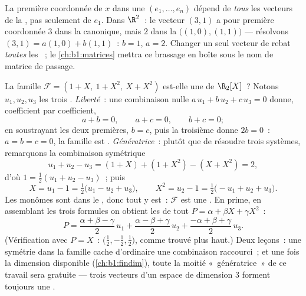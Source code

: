 \begin{remark}
\label{rem:b1:vspaces:teameffort}
La première coordonnée de $x$ dans une  $(e_1, \dots, e_n)$
dépend de \emph{tous} les vecteurs de la , pas seulement de $e_1$.
Dans $\R^2$~: le vecteur $(3, 1)$ a pour première coordonnée $3$ dans
la  canonique, mais $2$ dans la 
$\bigl((1,0), (1,1)\bigr)$ --- résolvons $(3,1) = a(1,0) + b(1,1)$~:
$b = 1$, $a = 2$. Changer un seul vecteur de  rebat \emph{toutes}
les ~; le \cref{ch:b1:matrices} mettra ce brassage en
boîte sous le nom de matrice de passage.
\end{remark}

\begin{example}
\label{ex:b1:vspaces:testbasis}
La famille $\mathcal{F} = (1 + X,\ 1 + X^2,\ X + X^2)$ est-elle une
 de $\R_2[X]$~? Notons $u_1, u_2, u_3$ les trois .
\emph{Liberté}~: une combinaison nulle $a\,u_1 + b\,u_2 + c\,u_3 =
0$ donne, coefficient par coefficient,
\[
a + b = 0, \qquad a + c = 0, \qquad b + c = 0 ;
\]
en soustrayant les deux premières, $b = c$, puis la troisième donne
$2b = 0$~: $a = b = c = 0$, la famille est . \emph{Génératrice}~:
plutôt que de résoudre trois systèmes, remarquons la combinaison
symétrique
\[
u_1 + u_2 - u_3 = (1 + X) + (1 + X^2) - (X + X^2) = 2 ,
\]
d'où $1 = \frac12(u_1 + u_2 - u_3)$~; puis
\[
X = u_1 - 1 = \tfrac12\bigl(u_1 - u_2 + u_3\bigr),
\qquad
X^2 = u_2 - 1 = \tfrac12\bigl(-u_1 + u_2 + u_3\bigr).
\]
Les monômes sont dans le , donc tout y est~:
$\mathcal{F}$ est une . En prime, en assemblant les trois formules
on obtient les  de tout $P = \alpha + \beta X + \gamma X^2$~:
\[
P = \frac{\alpha + \beta - \gamma}{2}\,u_1
+ \frac{\alpha - \beta + \gamma}{2}\,u_2
+ \frac{-\alpha + \beta + \gamma}{2}\,u_3 .
\]
(Vérification avec $P = X$~:  $\bigl(\frac12,
-\frac12, \frac12\bigr)$, comme trouvé plus haut.) Deux leçons~: une
symétrie dans la famille cache d'ordinaire une combinaison
raccourci~; et une fois la dimension disponible
(\cref{ch:b1:findim}), toute la moitié «~génératrice~» de ce travail
sera gratuite --- trois vecteurs  d'un espace de dimension $3$
forment toujours une .
\end{example}

